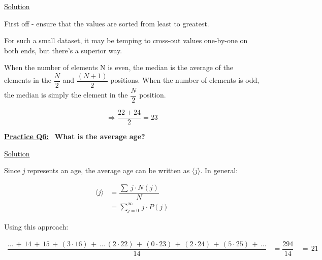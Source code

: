\bigskip

\underline{Solution}

First off - ensure that the values are sorted from least to greatest.

For such a small dataset, it may be temping to cross-out values one-by-one on
both ends, but there's a superior way.

When the number of elements N is even, the median is the average of the elements
in the $\dfrac{N}{2}$ and $\dfrac{(N+1)}{2}$ positions. When the number of
elements is odd, the median is simply the element in the $\dfrac{N}{2}$
position.

\[
    \Rightarrow \dfrac{22+24}{2} = \boxed{23}
\]

\bigskip \bigskip

\underline{\textbf{Practice Q6:}} \ \textbf{What is the average age?}

\bigskip

\underline{Solution}

Since \textit{j} represents an age, the average age can be written as
$\langle j \rangle$. In general:

\begin{align*}
    \langle j \rangle &= \dfrac{\sum \, j \cdot N(j)}{N} \\
    &= \sum_{j=0}^{\infty} \, j \cdot P(j)
\end{align*}

\newpage

Using this approach:

\begin{align*}
    \dfrac{\dots \, + \, 14 \, + \, 15 \, + \, (3 \cdot 16) \, + \, \dots \,
        (2 \cdot 22) \, + \, (0 \cdot 23) \, + \, (2 \cdot 24) \, + \,
        (5 \cdot 25) \, + \, \dots}{14} &= \dfrac{294}{14}
    \, &= \, \boxed{21}
\end{align*}